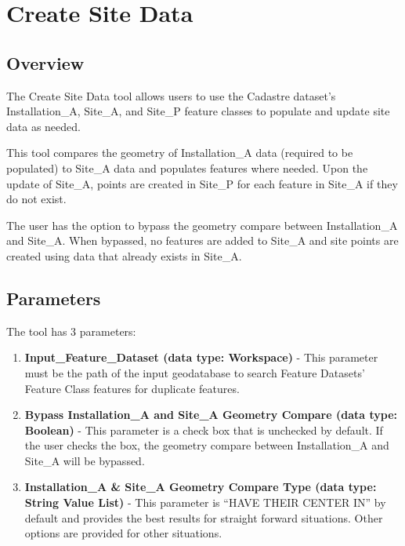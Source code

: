 \documentclass[openany]{book}
\providecommand{\tightlist}{%
  \setlength{\itemsep}{0pt}\setlength{\parskip}{0pt}}
\theoremstyle{definition}
\theoremstyle{definition}
\theoremstyle{definition}
\theoremstyle{remark}
\begin{document}
\chapter{Create Site Data}\label{siteData}

\section{Overview}\label{overview}

The Create Site Data tool allows users to use the Cadastre dataset's
Installation\_A, Site\_A, and Site\_P feature classes to populate and
update site data as needed.

This tool compares the geometry of Installation\_A data (required to be
populated) to Site\_A data and populates features where needed. Upon the
update of Site\_A, points are created in Site\_P for each feature in
Site\_A if they do not exist.

The user has the option to bypass the geometry compare between
Installation\_A and Site\_A. When bypassed, no features are added to
Site\_A and site points are created using data that already exists in
Site\_A.

\section{Parameters}\label{parameters}

The tool has 3 parameters:

\begin{enumerate}
\def\labelenumi{\arabic{enumi}.}
\tightlist
\item
  \textbf{Input\_Feature\_Dataset (data type: Workspace)} - This
  parameter must be the path of the input geodatabase to search Feature
  Datasets' Feature Class features for duplicate features.\\
\item
  \textbf{Bypass Installation\_A and Site\_A Geometry Compare (data
  type: Boolean)} - This parameter is a check box that is unchecked by
  default. If the user checks the box, the geometry compare between
  Installation\_A and Site\_A will be bypassed.
\item
  \textbf{Installation\_A \& Site\_A Geometry Compare Type (data type:
  String Value List)} - This parameter is ``HAVE THEIR CENTER IN'' by
  default and provides the best results for straight forward situations.
  Other options are provided for other situations.
\end{enumerate}
\end{document}
